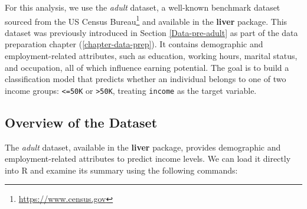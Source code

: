 \documentclass[
  11pt,
]{book}
\renewcommand{\href}[2]{#2\footnote{\url{#1}}}
\theoremstyle{definition}
\theoremstyle{definition}
\theoremstyle{definition}
\theoremstyle{definition}
\theoremstyle{remark}
\begin{document}
For this analysis, we use the \emph{adult} dataset, a well-known benchmark dataset sourced from the \href{https://www.census.gov}{US Census Bureau} and available in the \textbf{liver} package. This dataset was previously introduced in Section \ref{Data-pre-adult} as part of the data preparation chapter (\ref{chapter-data-prep}). It contains demographic and employment-related attributes, such as education, working hours, marital status, and occupation, all of which influence earning potential. The goal is to build a classification model that predicts whether an individual belongs to one of two income groups: \texttt{\textless{}=50K} or \texttt{\textgreater{}50K}, treating \texttt{income} as the target variable.

\subsection*{Overview of the Dataset}\label{overview-of-the-dataset-1}


The \emph{adult} dataset, available in the \textbf{liver} package, provides demographic and employment-related attributes to predict income levels. We can load it directly into R and examine its summary using the following commands:
\end{document}
